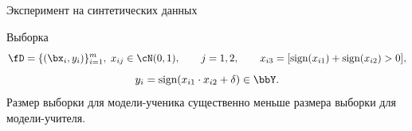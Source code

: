 \documentclass[12pt, aspectratio=169]{beamer}
\begin{document}
\begin{frame}{Эксперимент на синтетических данных}

\begin{block}{Выборка}
\fontsize{11}{5}\selectfont
$$\fD = \{(\bx_i, y_i)\}_{i=1}^{m},\; x_{ij} \in \cN(0, 1),\qquad j=1, 2, \qquad x_{i3} = [\text{sign}(x_{i1})+\text{sign}(x_{i2})>0],$$
$$y_i = \text{sign}(x_{i1} \cdot x_{i2}+\delta) \in \bbY.$$
Размер выборки для модели-ученика существенно меньше размера выборки для модели-учителя.
\vspace{-0.2 cm}
\end{block}
\begin{figure}
    \fontsize{5}{5}\selectfont
    \begin{minipage}[h]{0.3\linewidth}
    \end{minipage}
    \begin{minipage}[h]{0.3\linewidth}

\end{minipage}
\end{figure}
\end{frame}
\end{document}
